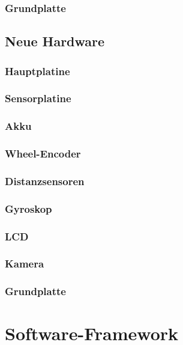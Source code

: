 \documentclass[a4paper,cleardoubleempty,BCOR1cm]{book}
\begin{document}
\subsubsection{Grundplatte}

\subsection{Neue Hardware}

\subsubsection{Hauptplatine}

\subsubsection{Sensorplatine}

\subsubsection{Akku}


\subsubsection{Wheel-Encoder}

\subsubsection{Distanzsensoren}

\subsubsection{Gyroskop}

\subsubsection{LCD}

\subsubsection{Kamera}

\subsubsection{Grundplatte}


\section{Software-Framework}
\end{document}
